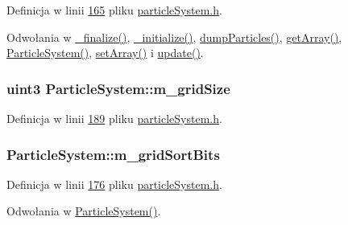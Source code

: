 Definicja w linii \hyperlink{particle_system_8h_source_l00165}{165} pliku \hyperlink{particle_system_8h_source}{particle\-System.\-h}.



Odwołania w \hyperlink{particle_system_8cpp_source_l00205}{\-\_\-finalize()}, \hyperlink{particle_system_8cpp_source_l00123}{\-\_\-initialize()}, \hyperlink{particle_system_8cpp_source_l00331}{dump\-Particles()}, \hyperlink{particle_system_8cpp_source_l00346}{get\-Array()}, \hyperlink{particle_system_8cpp_source_l00033}{Particle\-System()}, \hyperlink{particle_system_8cpp_source_l00374}{set\-Array()} i \hyperlink{particle_system_8cpp_source_l00238}{update()}.

\hypertarget{class_particle_system_ad555b31501a258d776e8c72c96178aa0}{
\subsubsection[{m\-\_\-grid\-Size}]{\setlength{\rightskip}{0pt plus 5cm}uint3 Particle\-System\-::m\-\_\-grid\-Size\hspace{0.3cm}{\ttfamily [protected]}}}\label{class_particle_system_ad555b31501a258d776e8c72c96178aa0}


Definicja w linii \hyperlink{particle_system_8h_source_l00189}{189} pliku \hyperlink{particle_system_8h_source}{particle\-System.\-h}.

\hypertarget{class_particle_system_a2a0452a32993337176d88fa2fbe63020}{
\subsubsection[{m\-\_\-grid\-Sort\-Bits}]{ Particle\-System\-::m\-\_\-grid\-Sort\-Bits\hspace{0.3cm}{\ttfamily [protected]}}}\label{class_particle_system_a2a0452a32993337176d88fa2fbe63020}


Definicja w linii \hyperlink{particle_system_8h_source_l00176}{176} pliku \hyperlink{particle_system_8h_source}{particle\-System.\-h}.



Odwołania w \hyperlink{particle_system_8cpp_source_l00033}{Particle\-System()}.

